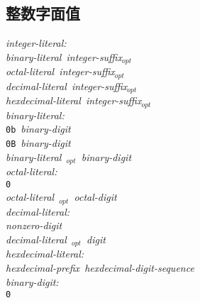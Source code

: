 \subsection{整数字面值}
\noindent \mbox{\qquad \textit{integer-literal:}}                             \\
\mbox{\qquad \qquad \textit{binary-literal integer-suffix$_{opt}$}}           \\
\mbox{\qquad \qquad \textit{octal-literal integer-suffix$_{opt}$}}            \\
\mbox{\qquad \qquad \textit{decimal-literal integer-suffix$_{opt}$}}          \\
\mbox{\qquad \qquad \textit{hexdecimal-literal integer-suffix$_{opt}$}}       \\
\noindent \mbox{\qquad \textit{binary-literal:}}                              \\
\mbox{\qquad \qquad \texttt{0b} \textit{binary-digit}}                        \\
\mbox{\qquad \qquad \texttt{0B} \textit{binary-digit}}                        \\
\mbox{\qquad \qquad \textit{binary-literal \qsgl$_{opt}$
                            binary-digit}}                                    \\
\noindent \mbox{\qquad \textit{octal-literal:}}                               \\
\mbox{\qquad \qquad \texttt{0}}                                               \\
\mbox{\qquad \qquad \textit{octal-literal \qsgl$_{opt}$
                            octal-digit}}                                     \\
\noindent \mbox{\qquad \textit{decimal-literal:}}                             \\
\mbox{\qquad \qquad \textit{nonzero-digit}}                                   \\
\mbox{\qquad \qquad \textit{decimal-literal \qsgl$_{opt}$
                            digit}}                                           \\
\noindent \mbox{\qquad \textit{hexdecimal-literal:}}                          \\
\mbox{\qquad \qquad \textit{hexdecimal-prefix hexdecimal-digit-sequence}}     \\
\noindent \mbox{\qquad \textit{binary-digit:}}                                \\
\mbox{\qquad \qquad \texttt{0}}                                               \\
